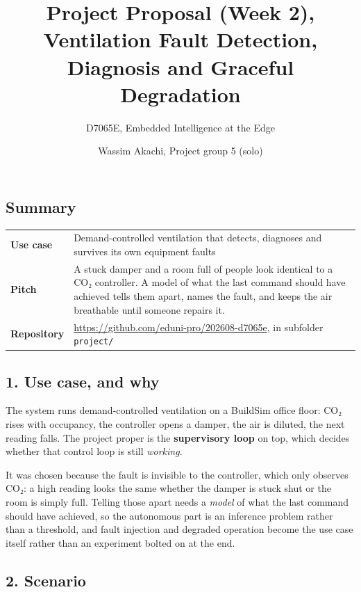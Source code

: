 \documentclass[
  11pt,
]{article}
\title{Project Proposal (Week 2), Ventilation Fault Detection, Diagnosis
and Graceful Degradation}
\subtitle{D7065E, Embedded Intelligence at the Edge}
\author{Wassim Akachi, Project group 5 (solo)}
\date{}
\begin{document}
\maketitle

\hypertarget{summary}{%
\subsection{Summary}\label{summary}}

\begin{longtable}[]{@{}
  >{\raggedright\arraybackslash}p{}
  >{\raggedright\arraybackslash}p{}@{}}
\toprule
\endhead
\textbf{Use case} & Demand-controlled ventilation that detects, diagnoses
and survives its own equipment faults \\
\textbf{Pitch} & A stuck damper and a room full of people look identical
to a CO₂ controller. A model of what the last command should have
achieved tells them apart, names the fault, and keeps the air breathable
until someone repairs it. \\
\textbf{Repository} & \url{https://github.com/eduni-pro/202608-d7065e}, in subfolder \texttt{project/} \\
\bottomrule
\end{longtable}

\hypertarget{use-case-and-why}{%
\subsection{1. Use case, and why}\label{use-case-and-why}}

The system runs demand-controlled ventilation on a BuildSim office
floor: CO₂ rises with occupancy, the controller opens a damper, the air
is diluted, the next reading falls. The project proper is the
\textbf{supervisory loop} on top, which decides whether that control loop
is still \emph{working}.

It was chosen because the fault is invisible to the controller, which
only observes CO₂: a high reading looks the same whether the damper is
stuck shut or the room is simply full. Telling those apart needs a
\emph{model} of what the last command should have achieved, so the
autonomous part is an inference problem rather than a threshold, and
fault injection and degraded operation become the use case itself rather
than an experiment bolted on at the end.

\hypertarget{scenario}{%
\subsection{2. Scenario}\label{scenario}}
\end{document}
